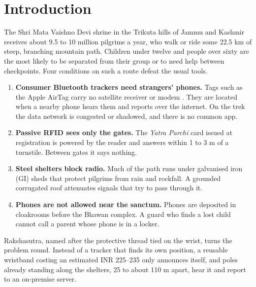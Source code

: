 \documentclass[11pt,a4paper]{article}
\begin{document}
\section{Introduction}
The Shri Mata Vaishno Devi shrine in the Trikuta hills of Jammu and Kashmir receives about 9.5 to 10 million pilgrims a
year, who walk or ride some 22.5 km of steep, branching mountain path. Children under twelve and people over sixty are
the most likely to be separated from their group or to need help between checkpoints. Four conditions on such a route
defeat the usual tools.

\begin{enumerate}
\item \textbf{Consumer Bluetooth trackers need strangers' phones.} Tags such as the Apple AirTag carry no satellite
receiver or modem \cite{heinrich}. They are located when a nearby phone hears them and reports over the internet. On the
trek the data network is congested or shadowed, and there is no common app.
\item \textbf{Passive RFID sees only the gates.} The \emph{Yatra Parchi} card issued at registration is powered by the
reader and answers within 1 to 3 m of a turnstile. Between gates it says nothing.
\item \textbf{Steel shelters block radio.} Much of the path runs under galvanised iron (GI) sheds that protect pilgrims
from rain and rockfall. A grounded corrugated roof attenuates signals that try to pass through it.
\item \textbf{Phones are not allowed near the sanctum.} Phones are deposited in cloakrooms before the Bhawan complex. A
guard who finds a lost child cannot call a parent whose phone is in a locker.
\end{enumerate}

Rakshasutra, named after the protective thread tied on the wrist, turns the problem round. Instead of a tracker that
finds its own position, a reusable wristband costing an estimated INR 225--235 only announces itself, and poles already
standing along the shelters, 25 to about 110 m apart, hear it and report to an on-premise server.
\end{document}

